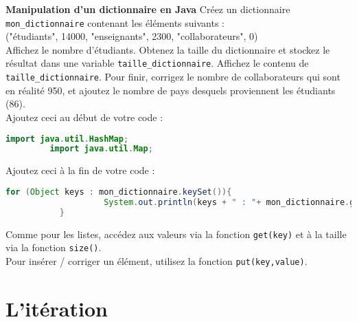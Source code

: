     \begin{Exercice}[10 minutes] \textbf{Manipulation d'un dictionnaire en Java}
      	Créez un dictionnaire \lstinline{mon_dictionnaire} contenant les éléments suivants : \\
      	
      	("étudiants", 14000, "enseignants", 2300, "collaborateurs", 0) \\
      	
      	Affichez le nombre d'étudiants. Obtenez la taille du dictionnaire et stockez le résultat dans une variable \lstinline{taille_dictionnaire}. Affichez le contenu de \lstinline{taille_dictionnaire}. Pour finir, corrigez le nombre de collaborateurs qui sont en réalité 950, et ajoutez le nombre de pays desquels proviennent les étudiants (86). \\
      	
      	Ajoutez ceci au début de votre code : \\
       
      	\begin{lstlisting}[language=Java]
             import java.util.HashMap;
	     import java.util.Map; \end{lstlisting}
	     
	     Ajoutez ceci à la fin de votre code : \\
	     
	    \begin{lstlisting}[language=Java]
             for (Object keys : mon_dictionnaire.keySet()){
            		System.out.println(keys + " : "+ mon_dictionnaire.get(keys));
	       } \end{lstlisting} 
    
        \begin{conseil}
           Comme pour les listes, accédez aux valeurs via la fonction \lstinline{get(key)} et à la taille via la fonction \lstinline{size()}. \\
            
           Pour insérer / corriger un élément, utilisez la fonction \lstinline{put(key,value)}.
		     
        \end{conseil}
        
        \begin{solution}
            
        \end{solution}
    \end{Exercice}
    
    \section{L'itération}
    
